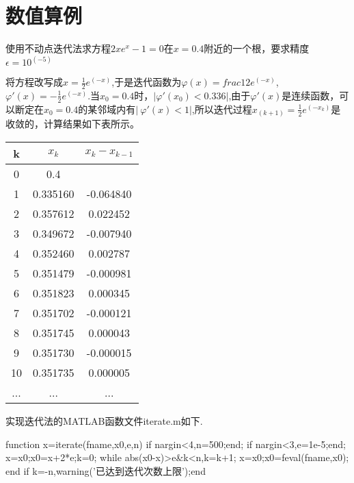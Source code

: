 \section{数值算例}
\begin{exmp}
使用不动点迭代法求方程$2xe^x-1=0$在$x=0.4$附近的一个根，要求精度$\epsilon=10^(-5)$
\end{exmp}
\begin{solution}
将方程改写成$x=\frac 1 2 e^(-x)$,于是迭代函数为$\varphi(x)=frac 1 2 e^(-x)$,$\varphi'(x)=-\frac1 2 e^(-x) $.当$x_0=0.4$时，$\lvert\varphi'(x_0)<0.336\rvert$,由于$\varphi'(x)$是连续函数，可以断定在$x_0=0.4$的某邻域内有$\lvert\ {\varphi'}(x)<1 \rvert$,所以迭代过程$x_(k+1)=\frac 1 2 e^(-x_k)$是收敛的，计算结果如下表所示。\\
\begin{tabular}{|c|c|c|}
\hline
k&$x_k$&${x_k-x_{k-1}}$\\
\hline
0&0.4&{ }\\
1&0.335160&-0.064840\\
2&0.357612&0.022452\\
3&0.349672&-0.007940\\
4&0.352460&0.002787\\
5&0.351479&-0.000981\\
6&0.351823&0.000345\\
7&0.351702&-0.000121\\
8&0.351745&0.000043\\
9&0.351730&-0.000015\\
10&0.351735&0.000005\\
...&...&...\\
\hline
\end{tabular}  

实现迭代法的MATLAB函数文件iterate.m如下.

\begin{everbatim}
function x=iterate(fname,x0,e,n)
if nargin<4,n=500;end;
if nargin<3,e=1e-5;end;
x=x0;x0=x+2*e;k=0;
while abs(x0-x)>e&k<n,k=k+1;
  x=x0;x0=feval(fname,x0);
 end
if k=-n,warning('已达到迭代次数上限');end
\end{everbatim}
\end{solution}
